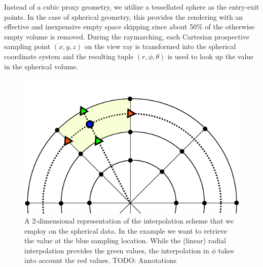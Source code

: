 \documentclass[journal]{vgtc}                %
\begin{document}
Instead of a cubic proxy geometry, we utilize a tessellated sphere as the entry-exit points. In the case of spherical geometry, this provides the rendering with an effective  and inexpensive empty space skipping since about 50\% of the otherwise empty volume is removed. During the raymarching, each Cartesian prospective sampling point $(x,y,z)$ on the view ray is transformed into the spherical coordinate system and the resulting tuple $(r, \phi, \theta)$ is used to look up the value in the spherical volume.

\begin{figure}[b!]
\newcommand{\abImageWidth}{0.65\columnwidth}
\centering
\includegraphics[width=\abImageWidth]{figures/spherical_interpolation.pdf}
\caption{A 2-dimensional representation of the interpolation scheme that we employ on the spherical data. In the example we want to retrieve the value at the blue sampling location. While the (linear) radial interpolation provides the green values, the interpolation in $\phi$ takes into account the red values. TODO: Annotations}
\label{fig:sphericalvolume}
\end{figure}
\end{document}
